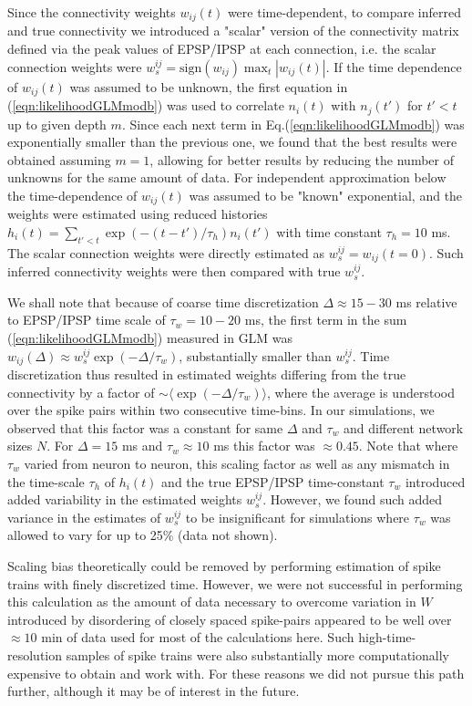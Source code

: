 Since the connectivity weights $w_{ij}(t)$ were time-dependent, to compare inferred and true connectivity we introduced a "scalar" version of the connectivity matrix defined via the peak values of EPSP/IPSP at each connection, i.e. the scalar connection weights were $w^{ij}_s=\text{sign}(w_{ij})\max_{t} |w_{ij}(t)|$.  If the time dependence of $w_{ij}(t)$ was assumed to be unknown, the first equation in (\ref{eqn:likelihoodGLMmodb}) was used to correlate $n_i(t)$ with $n_j(t')$ for $t'<t$ up to given depth $m$.  Since each next term in Eq.(\ref{eqn:likelihoodGLMmodb}) was exponentially smaller than the previous one, we found that the best results were obtained assuming $m=1$, allowing for better results by reducing the number of unknowns for the same amount of data.  For independent approximation below the time-dependence of $w_{ij}(t)$ was assumed to be "known" exponential, and the weights were estimated using reduced histories $h_{i}(t)=\sum_{t'<t} \exp(-(t-t')/\tau_h)n_{i}(t')$ with time constant $\tau_h=10$ ms. The scalar connection weights were directly estimated as $w^{ij}_s=w_{ij}(t=0)$.  Such inferred connectivity weights were then compared with true $w^{ij}_s$.

We shall note that because of coarse time discretization $\Delta \approx 15-30$ ms relative to EPSP/IPSP time scale of $\tau_w = 10-20$ ms, the first term in the sum (\ref{eqn:likelihoodGLMmodb}) measured in GLM was $w_{ij}(\Delta)\approx w^{ij}_s\exp(-\Delta/\tau_w)$, substantially smaller than $w^{ij}_s$. Time discretization thus resulted in estimated weights differing from the true connectivity by a factor of $\sim \langle \exp(-\Delta/\tau_w) \rangle$, where the average is understood over the spike pairs within two consecutive time-bins. In our simulations, we observed that this factor was a constant for same $\Delta$ and $\tau_w$ and different network sizes $N$. For $\Delta=15$ ms and $\tau_w\approx 10$ ms this factor was  $\approx 0.45$.  Note that where $\tau_w$ varied from neuron to neuron, this scaling factor as well as any mismatch in the time-scale $\tau_h$ of $h_i(t)$ and the true EPSP/IPSP time-constant $\tau_w$ introduced added variability in the estimated weights $w^{ij}_s$. However, we found such added variance in the estimates of $w^{ij}_s$ to be insignificant for simulations where $\tau_w$ was allowed to vary for up to 25\% (data not shown).

Scaling bias theoretically could be removed by performing estimation of spike trains with finely discretized time. However, we were not successful in performing this calculation as the amount of data necessary to overcome variation in $W$ introduced by disordering of closely spaced spike-pairs appeared to be well over $\approx 10$ min of data used for most of the calculations here. Such high-time-resolution samples of spike trains were also substantially more computationally expensive to obtain and work with. For these reasons we did not pursue this path further, although it may be of interest in the future.

